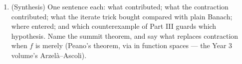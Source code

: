 \begin{problem}
\begin{enumerate}[resume]
        the factorial bound holds on the \emph{whole} segment,
        so existence and uniqueness are global there --- the
        scalar case of \cref{ch:b2:diffeq}'s Cauchy--Lipschitz
        theorem, with no restriction on the length $B - A$.
  \item (Synthesis) One sentence each: what 
        contributed; what the contraction contributed; what the
        iterate trick bought compared with plain Banach; where
         entered; and which counterexample of Part
        III guards which hypothesis. Name the summit theorem,
        and say what replaces contraction when $f$ is merely
         (Peano's theorem, via  in function
        spaces --- the Year 3 volume's Arzel\`a--Ascoli).
\end{enumerate}
\end{problem}

